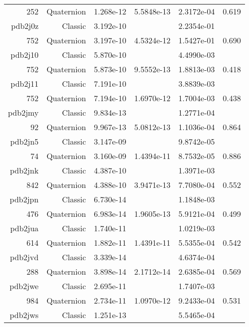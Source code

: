 \begin{xltabular}{\textwidth}{r|rS[table-format=1.3e+2]S[table-format=1.4e+2]S[table-format=1.4e+2]S[table-format=-1.3]}
252 & Quaternion & 1.268e-12 & 5.5848e-13 & 2.3172e-04 & 0.619\\  \addlinespace
{\color{red} pdb2j0z } & Classic & 3.192e-10 &  & 2.2354e-01 & \\
752 & Quaternion & 3.197e-10 & 4.5324e-12 & 1.5427e-01 & 0.690\\  \addlinespace
{\color{red} pdb2j10 } & Classic & 5.870e-10 &  & 4.4990e-03 & \\
752 & Quaternion & 5.873e-10 & 9.5552e-13 & 1.8813e-03 & 0.418\\  \addlinespace
{\color{red} pdb2j11 } & Classic & 7.191e-10 &  & 3.8839e-03 & \\
752 & Quaternion & 7.194e-10 & 1.6970e-12 & 1.7004e-03 & 0.438\\  \addlinespace
{\color{red} pdb2jmy } & Classic & 9.834e-13 &  & 1.2771e-04 & \\
92 & Quaternion & 9.967e-13 & 5.0812e-13 & 1.1036e-04 & 0.864\\  \addlinespace
{\color{red} pdb2jn5 } & Classic & 3.147e-09 &  & 9.8742e-05 & \\
74 & Quaternion & 3.160e-09 & 1.4394e-11 & 8.7532e-05 & 0.886\\  \addlinespace
{\color{red} pdb2jnk } & Classic & 4.387e-10 &  & 1.3971e-03 & \\
842 & Quaternion & 4.388e-10 & 3.9471e-13 & 7.7080e-04 & 0.552\\  \addlinespace
{\color{red} pdb2jpn } & Classic & 6.730e-14 &  & 1.1848e-03 & \\
476 & Quaternion & 6.983e-14 & 1.9605e-13 & 5.9121e-04 & 0.499\\  \addlinespace
{\color{red} pdb2jua } & Classic & 1.740e-11 &  & 1.0219e-03 & \\
614 & Quaternion & 1.882e-11 & 1.4391e-11 & 5.5355e-04 & 0.542\\  \addlinespace
{\color{red} pdb2jvd } & Classic & 3.339e-14 &  & 4.6374e-04 & \\
288 & Quaternion & 3.898e-14 & 2.1712e-14 & 2.6385e-04 & 0.569\\  \addlinespace
{\color{red} pdb2jwe } & Classic & 2.695e-11 &  & 1.7407e-03 & \\
984 & Quaternion & 2.734e-11 & 1.0970e-12 & 9.2433e-04 & 0.531\\  \addlinespace
{\color{red} pdb2jws } & Classic & 1.251e-13 &  & 5.5465e-04 & \\

\end{xltabular}
